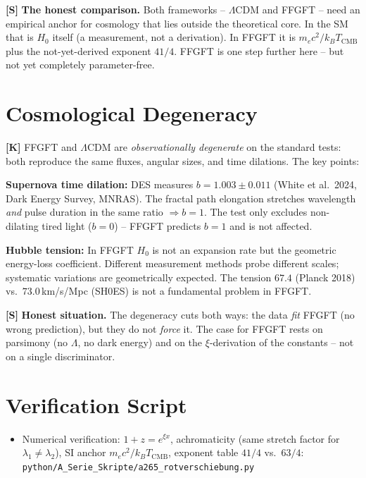 \textbf{[S]} \textbf{The honest comparison.} Both frameworks -- $\Lambda$CDM and
FFGFT -- need an empirical anchor for cosmology that lies outside the theoretical
core. In the SM that is $H_0$ itself (a measurement, not a derivation). In FFGFT
it is $m_ec^2/k_BT_\text{CMB}$ plus the not-yet-derived exponent $41/4$. FFGFT
is one step further here -- but not yet completely parameter-free.

\section{Cosmological Degeneracy}

\textbf{[K]} FFGFT and $\Lambda$CDM are \emph{observationally degenerate} on the
standard tests: both reproduce the same fluxes, angular sizes, and time dilations.
The key points:

\textbf{Supernova time dilation:} DES measures $b=1{.}003\pm0{.}011$ (White et al.\ 2024,
Dark Energy Survey, MNRAS). The fractal path elongation stretches wavelength
\emph{and} pulse duration in the same ratio $\Rightarrow b=1$. The test only
excludes non-dilating tired light ($b=0$) -- FFGFT predicts $b=1$ and is not
affected.

\textbf{Hubble tension:} In FFGFT $H_0$ is not an expansion rate but the geometric
energy-loss coefficient. Different measurement methods probe different scales;
systematic variations are geometrically expected. The tension $67{.}4$
(Planck 2018) vs.\ $73{.}0\,$km/s/Mpc (SH0ES) is not a fundamental problem in FFGFT.

\textbf{[S]} \textbf{Honest situation.} The degeneracy cuts both ways: the data
\emph{fit} FFGFT (no wrong prediction), but they do not \emph{force} it. The case
for FFGFT rests on parsimony (no $\Lambda$, no dark energy) and on the $\xi$-derivation
of the constants -- not on a single discriminator.

\section{Verification Script}

\begin{itemize}[leftmargin=2em,itemsep=2pt,topsep=2pt]
  \item Numerical verification: $1+z=e^{\xi x}$, achromaticity (same stretch
    factor for $\lambda_1\neq\lambda_2$), SI anchor $m_ec^2/k_BT_\text{CMB}$,
    exponent table $41/4$ vs.\ $63/4$:
    \texttt{python/A\_Serie\_Skripte/a265\_rotverschiebung.py}
\end{itemize}

